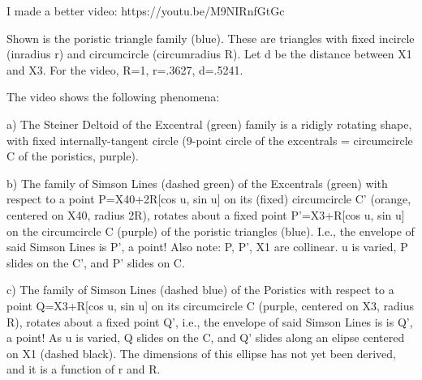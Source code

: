 I made a better video: https://youtu.be/M9NIRnfGtGc

Shown is the poristic triangle family (blue). These are triangles with fixed incircle (inradius r) and circumcircle (circumradius R). Let d be the distance between X1 and X3. For the video, R=1,  r=.3627, d=.5241.

The video shows the following phenomena:

a) The Steiner Deltoid of the Excentral (green) family is a ridigly rotating shape, with fixed internally-tangent circle (9-point circle of the excentrals = circumcircle C of the poristics, purple).

b) The family of Simson Lines (dashed green) of the Excentrals (green) with respect to a point P=X40+2R[cos u, sin u] on its (fixed) circumcircle C' (orange, centered on X40, radius 2R), rotates about a fixed point P'=X3+R[cos u, sin u] on the circumcircle C (purple) of the poristic triangles (blue). I.e., the envelope of said Simson Lines is P', a point! Also note: P, P', X1 are collinear. u is varied, P slides on the C', and P' slides on C.

c) The family of Simson Lines (dashed blue) of the Poristics with respect to a point Q=X3+R[cos u, sin u] on its circumcircle C (purple, centered on X3, radius R), rotates about a fixed point Q', i.e., the envelope of said Simson Lines is is Q', a point! As u is varied, Q slides on the C, and Q' slides along an elipse centered on X1 (dashed black). The dimensions of this ellipse has not yet been derived, and it is a function of r and R.